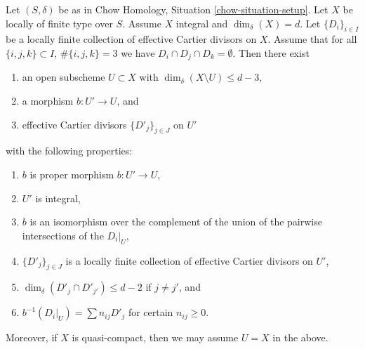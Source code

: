 \begin{lemma}
\label{lemma-blowing-up-intersections}
Let $(S, \delta)$ be as in Chow Homology, Situation \ref{chow-situation-setup}.
Let $X$ be locally of finite type over $S$.
Assume $X$ integral and $\dim_\delta(X) = d$.
Let $\{D_i\}_{i \in I}$ be a locally finite collection of
effective Cartier divisors on $X$.
Assume that for all $\{i, j, k\} \subset I$, $\#\{i, j, k\} = 3$
we have $D_i \cap D_j \cap D_k = \emptyset$.
Then there exist
\begin{enumerate}
\item an open subscheme $U \subset X$ with
$\dim_\delta(X \setminus U) \leq d - 3$,
\item a morphism $b : U' \to U$, and
\item effective Cartier divisors $\{D'_j\}_{j \in J}$ on $U'$
\end{enumerate}
with the following properties:
\begin{enumerate}
\item $b$ is proper morphism $b : U' \to U$,
\item $U'$ is integral,
\item $b$ is an isomorphism over the complement of the union of the pairwise
intersections of the $D_i|_U$,
\item $\{D'_j\}_{j \in J}$ is a locally finite collection of effective
Cartier divisors on $U'$,
\item $\dim_\delta(D'_j \cap D'_{j'}) \leq d - 2$ if $j \not = j'$, and
\item $b^{-1}(D_i|_U) = \sum n_{ij} D'_j$ for certain $n_{ij} \geq 0$.
\end{enumerate}
Moreover, if $X$ is quasi-compact, then we may assume $U = X$ in the above.
\end{lemma}

